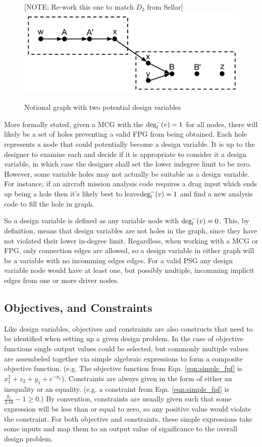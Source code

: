 \begin{figure}[htb!]
  \begin{center}
  [NOTE: Re-work this one to match $D_2$ from Sellar]
    \includegraphics[width=.6\textwidth]{images/design_vars_graph}
  \end{center}
  \caption{Notional graph with two potential design variables \label{f:designvars}}
\end{figure}

More formally stated, given a MCG with the $\textrm{deg}_l^-(v)=1$ for all nodes, 
there will likely be a set of holes preventing a valid FPG from being obtained. 
Each hole represents a node that could potentially become a design variable. 
It is up to the designer to examine each and decide if it is appropriate to 
consider it a design variable, in which case the designer shall set the lower 
indegree limit to be zero. However, some variable holes may not actually be 
suitable as a design variable. For instance, if an aircraft mission analysis 
code requires a drag input which ends up being a hole then it's likely best to 
leave$\textrm{deg}_l^-(v)=1$ and find a new analysis code to fill the hole in graph. 

So a design variable is defined as any variable node with $\textrm{deg}_l^-(v)=0$. 
This, by definition, means that design variables are not holes in the graph, since 
they have not violated their lower in-degree limit. Regardless, 
when working with a MCG or FPG, only connection edges are allowed, so a design 
variable in either graph will be a variable with no incomming edges edges. For a valid PSG 
any design variable node would have at least one, but possibly multiple, incomming 
implicit edges from one or more driver nodes. 

\subsection{Objectives, and Constraints}
\label{ss:objectives and constraints}
Like design variables, objectives and constraints are also constructs that need 
to be identified when setting up a given design problem. In the case of 
objective functions single output values could be selected, but commonly multiple 
values are assembeled together via simple algebraic expressions to form a composite 
objective function. (e.g. The objective function from Eqn. \ref{eqn:simple_fpf} is
$x_1^2+z_2+y_1+e^{-y_2}$). Constraints are always given in the 
form of either an inequality or an equality. (e.g. a constraint from Eqn. 
\ref{eqn:simple_fpf} is $\frac{y_1}{3.16}-1\geq0$.) By convention, 
constraints are usually given such that some expression will be less than or equal 
to zero, so any positive value would violate the constraint. For both objective 
and constraints, these simple expressions take some inputs and map them to an
output value of significance to the overall design problem. 

